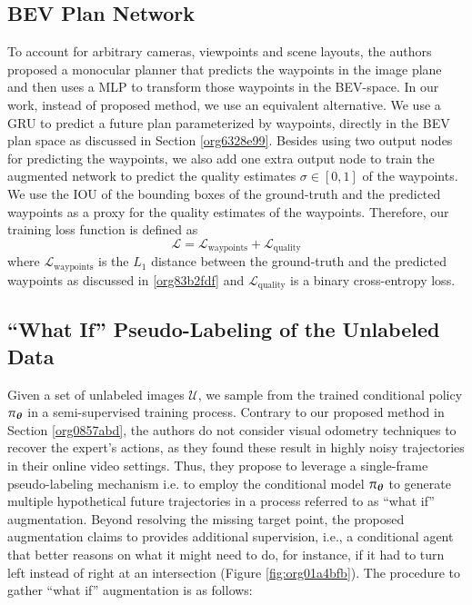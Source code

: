 \documentclass[12pt, letterpaper,cleardoubleempty,BCOR1cm]{scrbook}
\begin{document}
\subsection{BEV Plan Network}
\label{sec:orgf2d6dd1}
To account for arbitrary cameras, viewpoints and scene layouts, the authors
proposed a monocular planner that predicts the waypoints in the image plane and
then uses a MLP to transform those waypoints in the BEV-space. In our work,
instead of proposed method, we use an equivalent alternative. We use a GRU to
predict a future plan parameterized by waypoints, directly in the BEV plan space
as discussed in Section \ref{org6328e99}. Besides using two output nodes for predicting the
waypoints, we also add one extra output node to train the augmented network to
predict the quality estimates \(\sigma\in [0,1]\) of the waypoints. We use the IOU
of the bounding boxes of the ground-truth and the predicted waypoints as a proxy
for the quality estimates of the waypoints. Therefore, our training loss
function is defined as \[\mathcal{L}=\mathcal{L}_{\text{waypoints}}+\mathcal{L}_{\text{quality}}\] where
\(\mathcal{L}_{\text{waypoints}}\) is the \(L_{1}\) distance between the ground-truth and
the predicted waypoints as discussed in \ref{org83b2fdf} and \(\mathcal{L}_{\text{quality}}\) is a
binary cross-entropy loss.

\subsection{``What If'' Pseudo-Labeling of the Unlabeled Data \label{org9cab8c4}}
\label{sec:orgf63b015}
Given a set of unlabeled images \(\mathcal{U}\), we sample from the trained conditional
policy \(\pi_{\boldsymbol{\theta}}\) in a semi-supervised training process. Contrary to our
proposed method in Section \ref{org0857abd}, the authors do not consider visual odometry
techniques \cite{Wang2017} to recover the expert's actions, as they found these
result in highly noisy trajectories in their online video settings. Thus, they
propose to leverage a single-frame pseudo-labeling mechanism i.e. to employ the
conditional model \(\pi_{\boldsymbol{\theta}}\) to generate multiple hypothetical future
trajectories in a process referred to as ``what if'' augmentation. Beyond
resolving the missing target point, the proposed augmentation claims to provides
additional supervision, i.e., a conditional agent that better reasons on what it
might need to do, for instance, if it had to turn left instead of right at an
intersection (Figure \ref{fig:org01a4bfb}). The procedure to gather ``what if''
augmentation is as follows:
\end{document}
